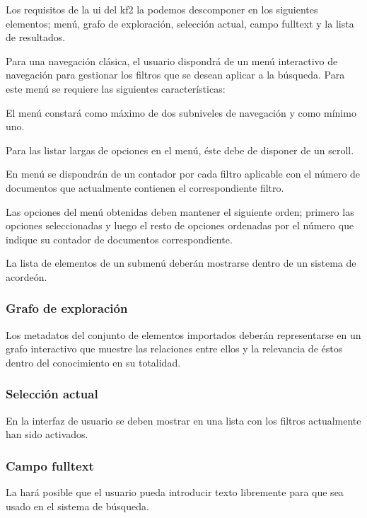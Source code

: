Los requisitos de la \gls{ui} del \gls{kf2} la podemos descomponer en los siguientes elementos; menú, grafo de exploración, selección actual, campo \gls{fulltext} y la lista de resultados.


Para una navegación clásica, el usuario dispondrá de un menú interactivo de navegación para gestionar los filtros que se desean aplicar a la búsqueda. Para este menú se requiere las siguientes características:

\begin{itemize}
El menú constará como máximo de dos subniveles de navegación y como mínimo uno.

Para las listar largas de opciones en el menú, éste debe de disponer de un \gls{scroll}.

En menú se dispondrán de un contador por cada filtro aplicable con el número de documentos que actualmente contienen el correspondiente filtro. 

Las opciones del menú obtenidas deben mantener el siguiente orden; primero las opciones seleccionadas y luego el resto de opciones ordenadas por el número que indique su contador de documentos correspondiente. 

La lista de elementos de un submenú deberán mostrarse dentro de un sistema de acordeón.
\end{itemize}

\subsubsection{Grafo de exploración}
Los \glspl{metadato} del conjunto de elementos importados deberán representarse en un grafo interactivo que muestre las relaciones entre ellos y la relevancia de éstos dentro del conocimiento en su totalidad.

\subsubsection{Selección actual}
En la interfaz de usuario se deben mostrar en una lista con los filtros actualmente han sido activados.

\subsubsection{Campo \gls{fulltext}}
La  hará posible que el usuario pueda introducir texto libremente para que sea usado en el sistema de búsqueda.


